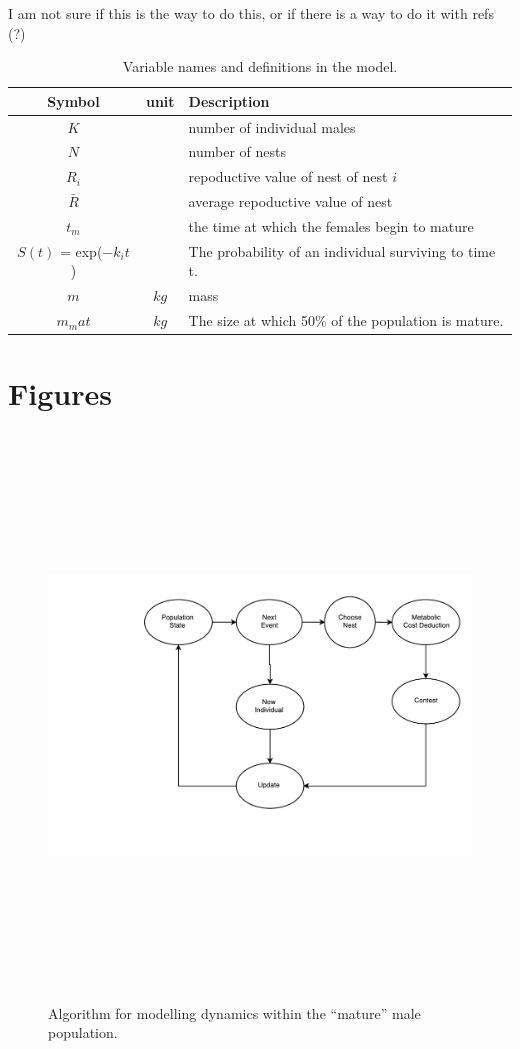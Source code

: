 \documentclass[a4paper,11pt]{article}
\begin{document}
I am not sure if this is the way to do this, 
or if there is a way to do it with refs (?)
\begin{table}[h!]
    \caption{Variable names and definitions in the model.}
    \centering
    \begin{tabular}{c | c | l }
        \hline
        Symbol & unit & Description\\
        \hline
        \hline
        $K$ & & number of individual males \\
        $N$ & & number of nests \\
        $R_i$ & & repoductive value of nest of nest $i$\\
        $\bar{R}$ & & average repoductive value of nest\\
        \hline
        $t_m$ & & the time at which the females begin to mature\\
        $S(t)$ = exp($-k_it$) & & The probability of an individual surviving to time t.\\
        \hline
        $m$ & $kg$ & mass\\
        $m_mat$ & $kg$ & The size at which 50\% of the population is mature.\\ 
        \hline
    \end{tabular}
\end{table}

\section{Figures}

\begin{figure}[h!]
\centering
\includegraphics[width=15cm,height=15cm,keepaspectratio]{figures/event_algorithm}
\caption{Algorithm for modelling dynamics within the ``mature'' male population.}
\label{fig:events}
\end{figure}
\clearpage
\end{document}
